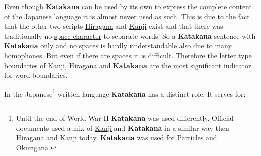 Even though \textbf{Katakana} can be used by its own to express the complete
content of the Japanese language it is almost never used as such. This is due
to the fact that the other two scripts \hyperref[sec:Hiragana]{Hiragana} and
\hyperref[sec:Kanji]{Kanji} exist and that there was traditionally no
\hyperref[sec:SpaceCharacter]{space character} to separate words. So a
\textbf{Katakana} sentence with \textbf{Katakana} only and no
\hyperref[sec:SpaceCharacter]{spaces} is hardly understandable also due to many
\hyperref[sec:Homophone]{homophones}. But even if there are
\hyperref[sec:SpaceCharacter]{spaces} it is difficult. Therefore the letter
type boundaries of \hyperref[sec:Kanji]{Kanji},
\hyperref[sec:Hiragana]{Hiragana} and \textbf{Katakana} are the most
significant indicator for word boundaries.


\label{sec:role}

In the Japanese\footnote{Until the end of World War II \textbf{Katakana} was
used differently. Official documents used a mix of \hyperref[sec:Kanji]{Kanji}
and \textbf{Katakana} in a similar way then \hyperref[sec:Hiragana]{Hiragana}
and \hyperref[sec:Kanji]{Kanji} today. \textbf{Katakana} was used for
Particles and \hyperref[sec:Okurigana]{Okurigana}.} written language
\textbf{Katakana} has a distinct role. It serves for:

\bigskip


